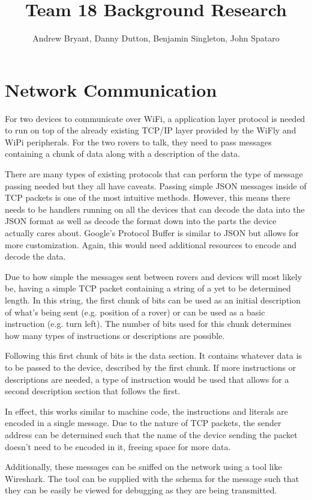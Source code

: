 \documentclass[12pt,letterpaper]{article}
\author{Andrew Bryant, Danny Dutton, Benjamin Singleton, John Spataro}
\title{\vspace{-3.0cm}Team 18 Background Research}
\begin{document}
\maketitle

\section{Network Communication}
For two devices to communicate over WiFi, a application layer protocol is needed to run on top of the already existing TCP/IP layer provided by the WiFly and WiPi peripherals. For the two rovers to talk, they need to pass messages containing a chunk of data along with a description of the data. 

There are many types of existing protocols that can perform the type of message passing needed but they all have caveats. Passing simple JSON messages inside of TCP packets is one of the most intuitive methods. However, this means there needs to be handlers running on all the devices that can decode the data into the JSON format as well as decode the format down into the parts the device actually cares about. Google's Protocol Buffer is similar to JSON but allows for more customization. Again, this would need additional resources to encode and decode the data.

Due to how simple the messages sent between rovers and devices will most likely be, having a simple TCP packet containing a string of a yet to be determined length.  In this string, the first chunk of bits can be used as an initial description of what's being sent (e.g. position of a rover) or can be used as a basic instruction (e.g. turn left). The number of bits used for this chunk determines how many types of instructions or descriptions are possible.

Following this first chunk of bits is the data section. It contains whatever data is to be passed to the device, described by the first chunk. If more instructions or descriptions are needed, a type of instruction would be used that allows for a second description section that follows the first.

In effect, this works similar to machine code, the instructions and literals are encoded in a single message. Due to the nature of TCP packets, the sender address can be determined such that the name of the device sending the packet doesn't need to be encoded in it, freeing space for more data.

Additionally, these messages can be sniffed on the network using a tool like Wireshark. The tool can be supplied with the schema for the message such that they can be easily be viewed for debugging as they are being transmitted.
\end{document}
